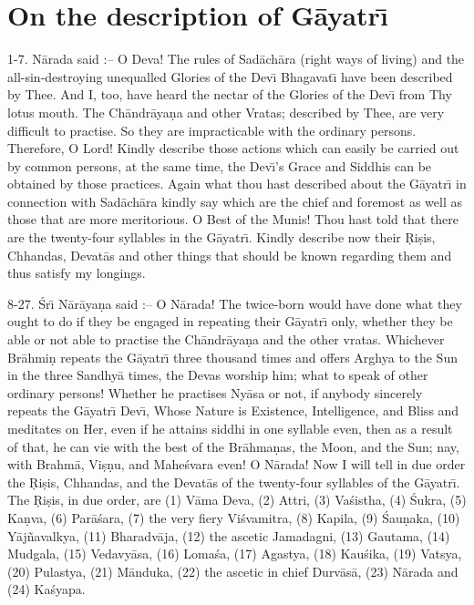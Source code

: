 \chapter{On the description of G\=ayatr\={\i}}

1-7. N\=arada said :-- O Deva! The rules of Sad\=ach\=ara (right ways of living) and the all-sin-destroying unequalled Glories of the Dev\={\i} Bhagavat\={\i} have been described by Thee. And I, too, have heard the nectar of the Glories of the Dev\={\i} from Thy lotus mouth. The Ch\=andr\=aya\d{n}a and other Vratas; described by Thee, are very difficult to practise. So they are impracticable with the ordinary persons. Therefore, O Lord! Kindly describe those actions which can easily be carried out by common persons, at the same time, the Dev\={\i}'s Grace and Siddhis can be obtained by those practices. Again what thou hast described about the G\=ayatr\={\i} in connection with Sad\=ach\=ara kindly say which are the chief and foremost as well as those that are more meritorious. O Best of the Munis! Thou hast told that there are the twenty-four syllables in the G\=ayatr\={\i}. Kindly describe now their \d{R}i\d{s}is, Chhandas, Devat\=as and other things that should be known regarding them and thus satisfy my longings.

8-27. \'Sr\={\i} N\=ar\=aya\d{n}a said :-- O N\=arada! The twice-born would have done what they ought to do if they be engaged in repeating their G\=ayatr\={\i} only, whether they be able or not able to practise the Ch\=andr\=aya\d{n}a and the other vratas. Whichever Br\=ahmi\d{n} repeats the G\=ayatr\={\i} three thousand times and offers Arghya to the Sun in the three Sandhy\=a times, the Devas worship him; what to speak of other ordinary persons! Whether he practises Ny\=asa or not, if anybody sincerely repeats the G\=ayatr\={\i} Dev\={\i}, Whose Nature is Existence, Intelligence, and Bliss and meditates on Her, even if he attains siddhi in one syllable even, then as a result of that, he can vie with the best of the Br\=ahma\d{n}as, the Moon, and the Sun; nay, with Brahm\=a, Vi\d{s}\d{n}u, and Mahe\'svara even! O N\=arada! Now I will tell in due order the \d{R}i\d{s}is, Chhandas, and the Devat\=as of the twenty-four syllables of the G\=ayatr\={\i}. The \d{R}i\d{s}is, in due order, are (1) V\=ama Deva, (2) Attri, (3) Va\'sistha, (4) \'Sukra, (5) Ka\d{n}va, (6) Par\=a\'sara, (7) the very fiery Vi\'svamitra, (8) Kapila, (9) \'Sau\d{n}aka, (10) Y\=aj\~navalkya, (11) Bharadv\=aja, (12) the ascetic Jamadagni, (13) Gautama, (14) Mudgala, (15) Vedavy\=asa, (16) Loma\'sa, (17) Agastya, (18) Kau\'sika, (19) Vatsya, (20) Pulastya, (21) M\=anduka, (22) the ascetic in chief Durv\=as\=a, (23) N\=arada and (24) Ka\'syapa.

